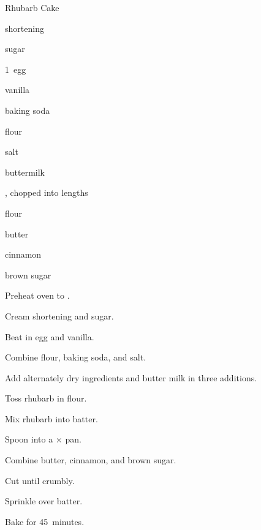 \begin{recipe}{Rhubarb Cake}{}{}

\begin{ingredients}
\item \C{\half} shortening
\item \C{1\half} sugar
\item 1~egg
\item {} vanilla
\item {} baking soda
\item {} flour
\item \tp{\half} salt
\item {} buttermilk
\item \C{2\quarter} , chopped into \inch{\half} lengths
\item {} flour
\item \C{\quarter} butter
\item {} cinnamon
\item {} brown sugar
\end{ingredients}

\begin{directions}
\item Preheat oven to .
\item Cream shortening and sugar.
\item Beat in egg and vanilla.
\item Combine  flour, baking soda, and salt.
\item Add alternately dry ingredients and butter milk in three additions.
\item Toss rhubarb in  flour.
\item Mix rhubarb into batter.
\item Spoon into a $\times$ pan.
\item Combine butter, cinnamon, and brown sugar.
\item Cut until crumbly.
\item Sprinkle over batter.
\item Bake for 45~minutes.
\end{directions}

\end{recipe}
